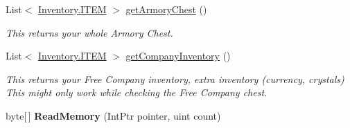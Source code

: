 \begin{DoxyCompactItemize}
List$<$ \hyperlink{structffxivlib_1_1_inventory_1_1_i_t_e_m}{Inventory.\-I\-T\-E\-M} $>$ \hyperlink{classffxivlib_1_1_f_f_x_i_v_l_i_b_a5fe239c8493c3dfef4c0dbfce645ccb1}{get\-Armory\-Chest} ()
\begin{DoxyCompactList}\small\item\em This returns your whole Armory Chest. \end{DoxyCompactList}\item 
List$<$ \hyperlink{structffxivlib_1_1_inventory_1_1_i_t_e_m}{Inventory.\-I\-T\-E\-M} $>$ \hyperlink{classffxivlib_1_1_f_f_x_i_v_l_i_b_a1c5ab49e698ec5996139d39f73e3ec5b}{get\-Company\-Inventory} ()
\begin{DoxyCompactList}\small\item\em This returns your Free Company inventory, extra inventory (currency, crystals) This might only work while checking the Free Company chest. \end{DoxyCompactList}\item 
\hypertarget{classffxivlib_1_1_f_f_x_i_v_l_i_b_a2e19fa6a85db14f2b15ff4038a33cd61}{byte\mbox{[}$\,$\mbox{]} {\bfseries Read\-Memory} (Int\-Ptr pointer, uint count)}\label{classffxivlib_1_1_f_f_x_i_v_l_i_b_a2e19fa6a85db14f2b15ff4038a33cd61}


\end{DoxyCompactItemize}
